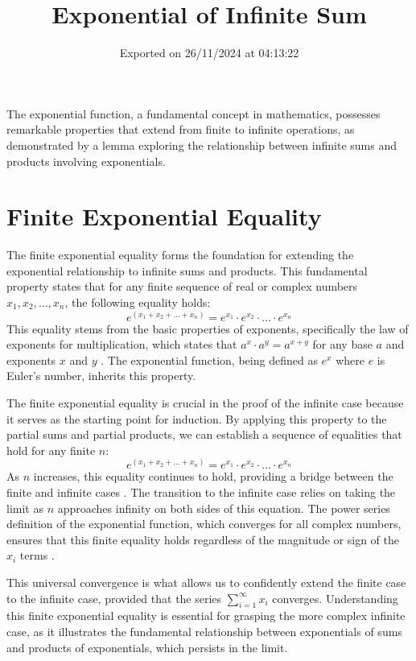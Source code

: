 \documentclass{article}
\begin{document}
\title{Exponential of Infinite Sum}
\author{}
\date{Exported on 26/11/2024 at 04:13:22}
\maketitle

The exponential function, a fundamental concept in mathematics, possesses remarkable properties that extend from finite to infinite operations, as demonstrated by a lemma exploring the relationship between infinite sums and products involving exponentials.

\section*{Finite Exponential Equality}

The finite exponential equality forms the foundation for extending the exponential relationship to infinite sums and products. This fundamental property states that for any finite sequence of real or complex numbers $x_1, x_2, \dots, x_n$, the following equality holds:
\[
e^{(x_1+x_2+\dots+x_n)} = e^{x_1} \cdot e^{x_2} \cdot \dots \cdot e^{x_n}
\]
This equality stems from the basic properties of exponents, specifically the law of exponents for multiplication, which states that $a^x \cdot a^y = a^{x+y}$ for any base $a$ and exponents $x$ and $y$ \cite{source1}. The exponential function, being defined as $e^x$ where $e$ is Euler's number, inherits this property.

The finite exponential equality is crucial in the proof of the infinite case because it serves as the starting point for induction. By applying this property to the partial sums and partial products, we can establish a sequence of equalities that hold for any finite $n$:
\[
e^{(x_1+x_2+\dots+x_n)} = e^{x_1} \cdot e^{x_2} \cdot \dots \cdot e^{x_n}
\]
As $n$ increases, this equality continues to hold, providing a bridge between the finite and infinite cases \cite{source2}. The transition to the infinite case relies on taking the limit as $n$ approaches infinity on both sides of this equation. The power series definition of the exponential function, which converges for all complex numbers, ensures that this finite equality holds regardless of the magnitude or sign of the $x_i$ terms \cite{source1, source3}. 

This universal convergence is what allows us to confidently extend the finite case to the infinite case, provided that the series $\sum_{i=1}^\infty x_i$ converges. Understanding this finite exponential equality is essential for grasping the more complex infinite case, as it illustrates the fundamental relationship between exponentials of sums and products of exponentials, which persists in the limit.
\end{document}

